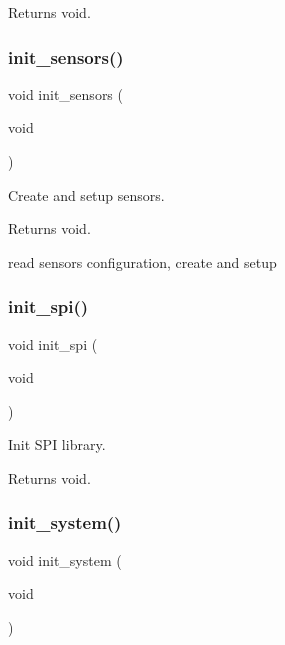 \begin{DoxyReturn}{Returns}
void. 
\end{DoxyReturn}
\mbox{\label{rmap_8ino_ac74850003fab6eb3269bfe043d0f939c}} 
\subsubsection{\texorpdfstring{init\+\_\+sensors()}{init\_sensors()}}
{\footnotesize\ttfamily void init\+\_\+sensors (\begin{DoxyParamCaption}\item[{void}]{ }\end{DoxyParamCaption})}



Create and setup sensors. 

\begin{DoxyReturn}{Returns}
void. 
\end{DoxyReturn}
read sensors configuration, create and setup \mbox{\label{rmap_8ino_a8eb9780a3438ec02c70314744f91f3c7}} 
\subsubsection{\texorpdfstring{init\+\_\+spi()}{init\_spi()}}
{\footnotesize\ttfamily void init\+\_\+spi (\begin{DoxyParamCaption}\item[{void}]{ }\end{DoxyParamCaption})}



Init S\+PI library. 

\begin{DoxyReturn}{Returns}
void. 
\end{DoxyReturn}
\mbox{\label{rmap_8ino_afceb890a6ab9be73cc5481369538c705}} 
\subsubsection{\texorpdfstring{init\+\_\+system()}{init\_system()}}
{\footnotesize\ttfamily void init\+\_\+system (\begin{DoxyParamCaption}\item[{void}]{ }\end{DoxyParamCaption})}



